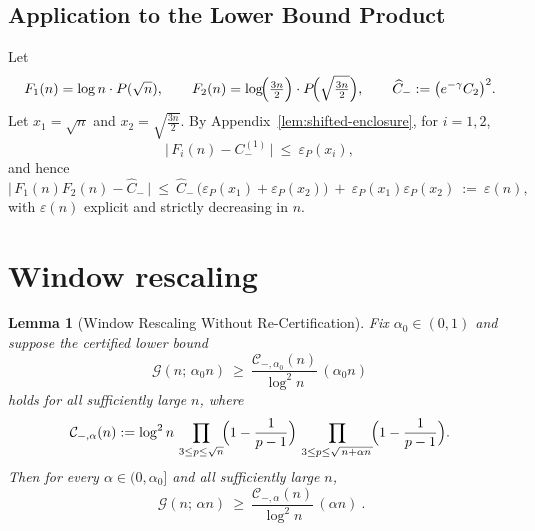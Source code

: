 \documentclass[11pt]{article}
\theoremstyle{inline}
\theoremstyle{break}
\newtheorem{lemma}{Lemma}
\theoremstyle{break}
\theoremstyle{break}
\theoremstyle{break}
\theoremstyle{break}
\theoremstyle{break}
\theoremstyle{break}
\theoremstyle{inline}
\newcommand{\CminusProductAlpha}[2]{\mathcal{C}_{-,#2}\!\left(#1\right)}
\begin{document}
\subsection{Application to the Lower Bound Product}
Let
\begin{equation}
F_1(n)=\log n\cdot P(\sqrt{n}),\qquad
F_2(n)=\log\!\Bigl(\tfrac{3n}{2}\Bigr)\cdot P\!\Bigl(\sqrt{\tfrac{3n}{2}}\Bigr),
\qquad
\widehat C_- := \bigl(e^{-\gamma}C_2\bigr)^2 .
\end{equation}
Let \(x_1=\sqrt{n}\) and \(x_2=\sqrt{\frac{3n}{2}}\).
By Appendix~\ref{lem:shifted-enclosure}, for \( i=1,2 \),
\begin{equation}
\bigl|\,F_i(n)-C_-^{(1)}\,\bigr|\ \le\ \varepsilon_P(x_i),
\end{equation}
and hence
\begin{equation}
\bigl|\,F_1(n)F_2(n)-\widehat C_-\,\bigr|
\ \le\ \widehat C_-\,\bigl(\varepsilon_P(x_1)+\varepsilon_P(x_2)\bigr)
\ +\ \varepsilon_P(x_1)\varepsilon_P(x_2)
\ :=\ \varepsilon(n),
\end{equation}
with \( \varepsilon(n) \) explicit and strictly decreasing in \( n \).

\section{Window rescaling}\label{app:window-rescale}

\begin{lemma}[Window Rescaling Without Re-Certification]
\label{lem:alpha-rescale}
Fix \(\alpha_0\in(0,1)\) and suppose the certified lower bound
\begin{equation}\label{eq:alpha0-certified}
\mathcal G(n;\,\alpha_0 n)\ \ge\ \frac{\CminusProductAlpha{n}{\alpha_0}}{\log^2 n}\,(\alpha_0 n)
\end{equation}
holds for all sufficiently large \(n\), where
\begin{equation}\label{eq:Cminus-alpha-def}
\CminusProductAlpha{n}{\alpha}
:=\log^2 n\,
\prod_{3\le p\le \sqrt n}\!\Bigl(1-\frac{1}{p-1}\Bigr)\,
\prod_{3\le p\le \sqrt{\,n+\alpha n\,}}\!\Bigl(1-\frac{1}{p-1}\Bigr).
\end{equation}
Then for every \(\alpha\in(0,\alpha_0]\) and all sufficiently large \(n\),
\begin{equation}\label{eq:alpha-certified}
\boxed{\ \ \mathcal G(n;\,\alpha n)\ \ge\ \frac{\CminusProductAlpha{n}{\alpha}}{\log^2 n}\,(\alpha n)\ .\ }
\end{equation}
\end{lemma}
\end{document}
